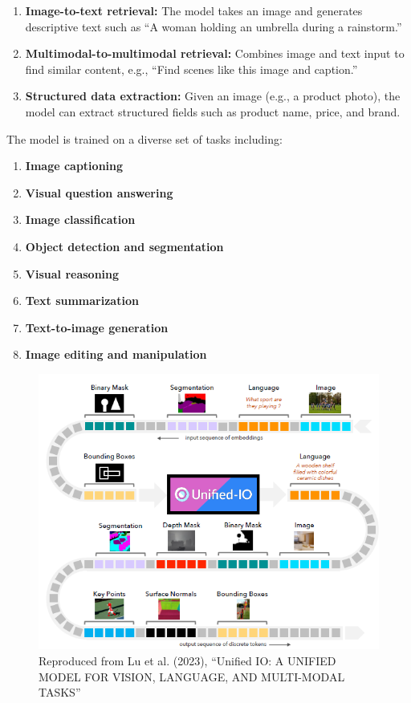 \documentclass[conference]{IEEEtran}
\begin{document}
\begin{enumerate}
\begin{enumerate}
    \item \textbf{Image-to-text retrieval:} The model takes an image and generates descriptive text such as “A woman holding an umbrella during a rainstorm.”
    
    \item \textbf{Multimodal-to-multimodal retrieval:} Combines image and text input to find similar content, e.g., “Find scenes like this image and caption.”
    
    \item \textbf{Structured data extraction:} Given an image (e.g., a product photo), the model can extract structured fields such as product name, price, and brand.
\end{enumerate}

The model is trained on a diverse set of tasks including:

\begin{enumerate}
    \item \textbf{Image captioning}
    \item \textbf{Visual question answering}
    \item \textbf{Image classification}
    \item \textbf{Object detection and segmentation}
    \item \textbf{Visual reasoning}
    \item \textbf{Text summarization}
    \item \textbf{Text-to-image generation}
    \item \textbf{Image editing and manipulation}
\end{enumerate}

\begin{figure}
    \centering
    \includegraphics[width=0.75\linewidth]{images/image2.png}
    \caption{Reproduced from Lu et al. (2023), “Unified IO: A UNIFIED MODEL FOR VISION, LANGUAGE, AND MULTI-MODAL TASKS”}
    \label{fig:enter-label}
\end{figure}


\end{enumerate}
\end{document}

